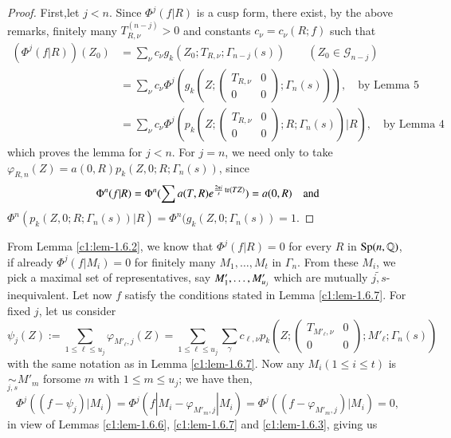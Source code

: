 \begin{proof}
First,\pageoriginale let $j<n$. Since $\Phi^{j}(f|R)$ is a cusp form,
there exist, by the above remarks, finitely many $T^{(n-j)}_{R,\nu}>0$
and constants $c_{\nu}=c_{\nu}(R;f)$ such that 
\begin{align*}
(\Phi^{j}(f|R))(Z_{0}) &=
  \sum_{\nu}c_{\nu}g_{k}(Z_{0};T_{R,\nu};\Gamma_{n-j}(s))\qquad
  (Z_{0}\in\mathscr{G}_{n-j})\\
&=\sum_{\nu}c_{\nu}\Phi^{j}(g_{k}(Z;
\begin{pmatrix}
T_{R,\nu} & 0\\
0 & 0
\end{pmatrix};
\Gamma_{n}(s))), \quad\text{by Lemma 5}\\
&= \sum_{\nu}c_{\nu}\Phi^{j}(p_{k}(Z;
\begin{pmatrix}
T_{R,\nu} & 0\\
0 & 0
\end{pmatrix};
R;\Gamma_{n}(s))|R),\quad \text{by Lemma 4}
\end{align*}
which proves the lemma for $j<n$. For $j=n$, we need only to take
$\varphi_{R,n}(Z)=a(0,R)p_{k}(Z,0;R;\Gamma_{n}(s))$, since
$$
\Phi^{n}(f|R)=\Phi^{n}(\sum a(T,R)e^{\frac{2\pi
    i}{s}\operatorname{tr}(TZ)})=a(0,R)\quad\text{and}
$$
$\Phi^{n}(p_{k}(Z,0;R;\Gamma_{n}(s))|R)=\Phi^{n}(g_{k}(Z,0;\Gamma_{n}(s))=1$.
\end{proof}

From Lemma \ref{c1:lem-1.6.2}, we know that $\Phi^{j}(f|R)=0$ for every
$R$ in $\operatorname{Sp}(n,\mathbb{Q})$, if already $\Phi^{j}(f|M_{i})=0$ for
finitely many $M_{1},\ldots,M_{t}$ in $\Gamma_{n}$. From these
$M_{i}$, we pick a maximal set of representatives, say
$M'_{1},\ldots,\break M'_{u_{j}}$ which are mutually
$\tilde{j,s}$-inequivalent. Let now $f$ satisfy the conditions
stated in Lemma \ref{c1:lem-1.6.7}. For fixed $j$, let us consider
$$
\psi_{j}(Z):=\sum_{1\leq \ell\leq
  u_{j}}\varphi_{M'_{\ell},j}(Z)=\sum_{1\leq \ell\leq
  u_{j}}\sum_{\gamma}c_{\ell,\nu}p_{k}(Z;
\begin{pmatrix}
T_{M'_{\ell},\nu} & 0\\
0 & 0
\end{pmatrix};
M'_{\ell};\Gamma_{n}(s))
$$
with the same notation as in Lemma \ref{c1:lem-1.6.7}. Now any
$M_{i}(1\leq i\leq t)$ is $\underset{j,s}{\sim} M'_{m}$
for\pageoriginale some $m$ with $1\leq m\leq u_{j}$; we have then,
$$
\Phi^{j}((f-\psi_{j})|M_{i})=\Phi^{j}(f|M_{i}-\varphi_{M'_{m},j}|M_{i})=\Phi^{j}((f-\varphi_{M'_{m},j})|M_{i})=0,
$$
in view of Lemmas \ref{c1:lem-1.6.6}, \ref{c1:lem-1.6.7} and
\ref{c1:lem-1.6.3}, giving us

